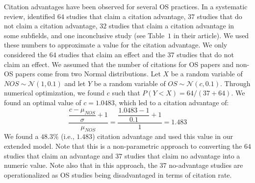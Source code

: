 \documentclass[meta, authordate,issue]{jote-new-article}
\begin{document}
\begin{enumerate}
        Citation advantages have been observed for several OS practices. In a systematic review, \textcite{LanghamputrowBakkerRiegelman2021} identified $64$ studies that claim a citation advantage, $37$ studies that do not claim a citation advantage, $32$ studies that claim a citation advantage in some subfields, and one inconclusive study (see Table~$1$ in their article). We used these numbers to approximate a value for the citation advantage. We only considered the $64$ studies that claim an effect and the $37$ studies that do not claim an effect. We assumed that the number of citations for OS papers and non-OS papers come from two Normal distributions. Let $X$ be a random variable of $NOS\sim\mathcal{N}\left(1, 0.1\right)$ and let $Y$ be a random variable of $OS\sim\mathcal{N}\left(c, 0.1\right)$. Through numerical optimization, we found $c$ such that $P\left(Y<X\right)=64/\left(37+64\right)$. We found an optimal value of $c=1.0483$, which led to a citation advantage of:
        \begin{equation}
          \dfrac{\dfrac{c-\mu_{NOS}}{\sigma}+1}{\mu_{NOS}}=\dfrac{\dfrac{1.0483-1}{0.1}+1}{1}=1.483
        \end{equation}
        We found a $48.3\%$ (i.e., $1.483$) citation advantage and used this value in our extended model. Note that this is a non-parametric approach to converting the $64$ studies that claim an advantage and $37$ studies that claim no advantage into a numeric value. Note also that in this approach, the $37$ no-advantage studies are operationalized as OS studies being disadvantaged in terms of citation rate.
\end{enumerate}
%
\end{document}

